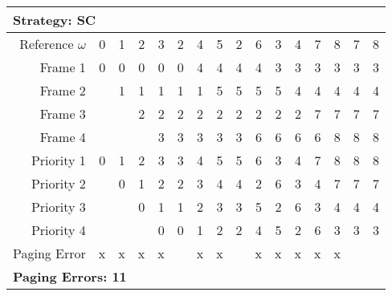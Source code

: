 \documentclass[a4paper, 11pt]{article}
\begin{document}
      \begin{center}
      \begin{tabular}{|r||r|r|r|r|r|r|r|r|r|r|r|r|r|r|r|}
            \multicolumn{16}{l}{\textbf{Strategy: SC}}\\
            \hline
                  Reference $\omega$ & 0 & 1 & 2 & 3 & 2 & 4 & 5 & 2 & 6 & 3 & 4 & 7 & 8 & 7 & 8 \\
            \hline\hline
                  Frame 1    &0&0&0&0&0&4&4&4&4&3&3&3&3&3&3   \\\hline
                  Frame 2    &&1&1&1&1&1&5&5&5&5&4&4&4&4&4   \\\hline
                  Frame 3    &&&2&2&2&2&2&2&2&2&2&7&7&7&7   \\\hline
                  Frame 4    &&&&3&3&3&3&3&6&6&6&6&8&8&8   \\
            \hline\hline
                  Priority 1 &0&1&2&3&3&4&5&5&6&3&4&7&8&8&8   \\\hline
                  Priority 2 &&0&1&2&2&3&4&4&2&6&3&4&7&7&7   \\\hline
                  Priority 3 &&&0&1&1&2&3&3&5&2&6&3&4&4&4   \\\hline
                  Priority 4 &&&&0&0&1&2&2&4&5&2&6&3&3&3   \\
            \hline\hline
                  Paging Error  &x&x&x&x&&x&x&&x&x&x&x&x&&   \\
            \hline
            \multicolumn{16}{l}{\textbf{Paging Errors: 11}}\\
      \end{tabular}
      \end{center}
\end{document}
